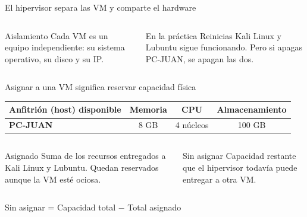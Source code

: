 \documentclass[aspectratio=169,10pt,c]{beamer}
\begin{document}
\begin{frame}{El hipervisor separa las VM y comparte el hardware}
\begin{center}
\end{center}
\begin{columns}[T,onlytextwidth]
\begin{block}{Aislamiento}
\small Cada VM es un equipo independiente: su sistema operativo, su disco y su IP.
\end{block}
\begin{exampleblock}{En la práctica}
\small Reinicias Kali Linux y Lubuntu sigue funcionando. Pero si apagas PC-JUAN, se apagan las dos.
\end{exampleblock}
\end{columns}
\end{frame}

\begin{frame}{Asignar a una VM significa reservar capacidad física}
\begin{center}
\small
\begin{tabular}{>{\bfseries}p{3.6cm}ccc}
\toprule
Anfitrión (host) disponible & Memoria & CPU & Almacenamiento \\
\midrule
PC-JUAN & 8 GB & 4 núcleos & 100 GB \\
\bottomrule
\end{tabular}
\end{center}
\vspace{0.25cm}
\begin{columns}[T,onlytextwidth]
\begin{block}{Asignado}
\small Suma de los recursos entregados a Kali Linux y Lubuntu. Quedan reservados aunque la VM esté ociosa.
\end{block}
\begin{block}{Sin asignar}
\small Capacidad restante que el hipervisor todavía puede entregar a otra VM.
\end{block}
\end{columns}
\vspace{0.2cm}
\centering\large Sin asignar = Capacidad total $-$ Total asignado
\end{frame}
\end{document}

